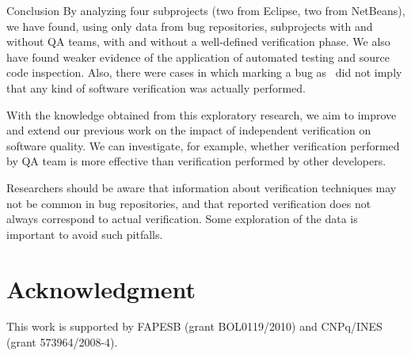 \begin{section}{Conclusion} \label{sec:conclusion}
	By analyzing four subprojects (two from Eclipse, two from NetBeans), we have found, using only data from bug repositories, subprojects with and without QA teams, with and without a well-defined verification phase. We also have found weaker evidence of the application of automated testing and source code inspection. Also, there were cases in which marking a bug as \VERIFIED\ did not imply that any kind of software verification was actually performed.
			
	With the knowledge obtained from this exploratory research, we aim to improve and extend our previous work on the impact of independent verification on software quality. We can investigate, for example, whether verification performed by QA team is more effective than verification performed by other developers.
	
	Researchers should be aware that information about verification techniques may not be common in bug repositories, and that reported verification does not always correspond to actual verification. Some exploration of the data is important to avoid such pitfalls.
	
	
\end{section}

\section*{Acknowledgment}

\small{This work is supported by FAPESB (grant BOL0119/2010) and CNPq/INES (grant 573964/2008-4).}
